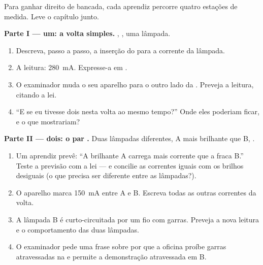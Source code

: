 \begin{problem}\label{pb:g8:intensity-ammeter:1}
Para ganhar direito de bancada, cada aprendiz percorre quatro
estações de medida. Leve o capítulo junto.

\medskip\noindent\textbf{Parte I ---  um: a volta simples.}
, , uma lâmpada.
\begin{enumerate}
  \item Descreva, passo a passo, a inserção do  para 
        a corrente da lâmpada.
  \item A leitura: \qty{280}{mA}. Expresse-a em .
  \item O examinador muda o seu aparelho para o outro lado da .
        Preveja a leitura, citando a lei.
  \item ``E se eu tivesse dois  nesta volta ao mesmo
        tempo?'' Onde eles poderiam ficar, e o que mostrariam?
\end{enumerate}

\medskip\noindent\textbf{Parte II ---  dois: o par .}
Duas lâmpadas diferentes, A mais brilhante que B, .
\begin{enumerate}[resume]
  \item Um aprendiz prevê: ``A brilhante A carrega mais corrente que
        a fraca B.'' Teste a previsão com a lei --- e concilie as
        correntes iguais com os brilhos desiguais (o que precisa ser
        diferente entre as lâmpadas?).
  \item O aparelho marca \qty{150}{mA} entre A e B. Escreva todas as
        outras correntes da volta.
  \item A lâmpada B é curto-circuitada por um fio com garras. Preveja
        a nova leitura e o comportamento das duas lâmpadas.
  \item O examinador pede uma frase sobre por que a oficina proíbe
        garras atravessadas na \emph{} e permite a demonstração
        atravessada em B.
\end{enumerate}


\end{problem}
